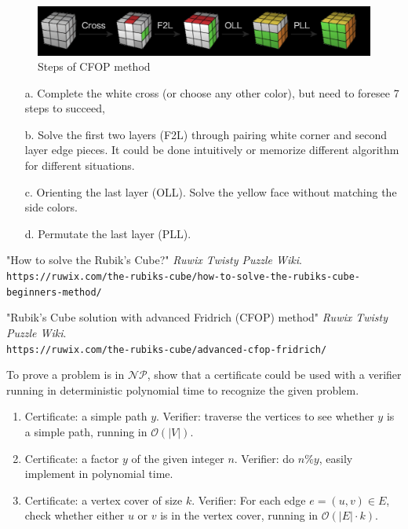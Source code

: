 \documentclass{assignment}
\begin{document}
\begin{homeworkProblem}
\begin{enumerate}
\begin{figure}[!ht]
\centering
\includegraphics[scale=0.6]{cube2.png}
\caption{Steps of CFOP method}
\label{fig:cfop}
\end{figure}
\begin{enumerate}
\item[a.] Complete the white cross (or choose any other color), but need to foresee 7 steps to succeed, 

\item[b.] Solve the first two layers (F2L) through pairing white corner and second layer edge pieces. It could be done intuitively or memorize different algorithm for different situations. 
\item[c.] Orienting the last layer (OLL). Solve the yellow face without matching the side colors. 
\item[d.] Permutate the last layer (PLL).  
\end{enumerate}

\end{enumerate}    

\begin{thebibliography}{9}
"How to solve the Rubik's Cube?"
\textit{Ruwix Twisty Puzzle Wiki}. 
\\\texttt{https://ruwix.com/the-rubiks-cube/how-to-solve-the-rubiks-cube-beginners-method/}

"Rubik's Cube solution with advanced Fridrich (CFOP) method"
\textit{Ruwix Twisty Puzzle Wiki}. 
\\\texttt{https://ruwix.com/the-rubiks-cube/advanced-cfop-fridrich/}
\end{thebibliography}

    
    \end{homeworkProblem}
        \begin{homeworkProblem}
        To prove a problem is in $\mathcal{NP}$, show that a certificate could be used with a verifier running in deterministic polynomial time to recognize the given problem. 
        \begin{enumerate}
        \item Certificate: a simple path $y$. Verifier: traverse the vertices to see whether $y$ is a simple path, running in $\mathcal{O}(|V|)$.
        \item Certificate: a factor $y$ of the given integer $n$. Verifier: do $n \% y$, easily implement in polynomial time.
        \item Certificate: a vertex cover of size $k$. Verifier: For each edge $e=(u,v) \in E$, check whether either $u$ or $v$ is in the vertex cover, running in $\mathcal{O}(|E|\cdot k )$.
          
        \end{enumerate}
\end{homeworkProblem}
    
\end{document}
